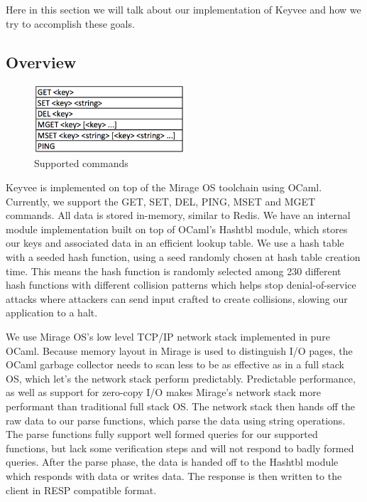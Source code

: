 \documentclass[english,10pt,twocolumn]{article}
\begin{document}
Here in this section we will talk about our implementation of Keyvee and how we try to accomplish these goals.

\subsection{Overview}

\begin{figure}[ht]
  \centering
  \caption{Supported commands}
  \includegraphics[width=0.5\textwidth]{images/commands_new}
\end{figure}

Keyvee is implemented on top of the Mirage OS toolchain using OCaml.
Currently, we support the GET, SET, DEL, PING, MSET and MGET commands.
All data is stored in-memory, similar to Redis.
We have an internal module implementation built on top of OCaml's Hashtbl module, which stores our keys and associated data in an efficient lookup table.
We use a hash table with a seeded hash function, using a seed randomly chosen at hash table creation time.
This means the hash function is randomly selected among 230 different hash functions with different collision patterns which helps stop denial-of-service attacks where attackers can send input crafted to create collisions, slowing our application to a halt.

We use Mirage OS's low level TCP/IP network stack implemented in pure OCaml.
Because memory layout in Mirage is used to distinguish I/O pages, the OCaml garbage collector needs to scan less to be as effective as in a full stack OS, which let's the network stack perform predictably.
Predictable performance, as well as support for zero-copy I/O makes Mirage's network stack more performant than traditional full stack OS.
The network stack then hands off the raw data to our parse functions, which parse the data using string operations.
The parse functions fully support well formed queries for our supported functions, but lack some verification steps and will not respond to badly formed queries.
After the parse phase, the data is handed off to the Hashtbl module which responds with data or writes data.
The response is then written to the client in RESP compatible format.
\end{document}
